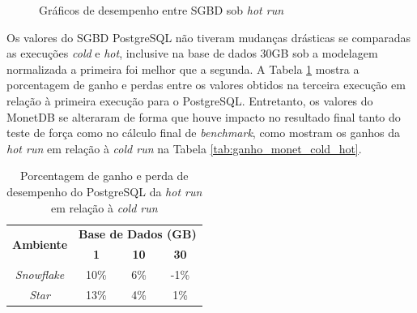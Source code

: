 \begin{figure}[htpb]
        \centering
        \caption{Gráficos de desempenho entre SGBD sob \textit{hot run}}
        \label{fig:qph_sgbd_hot}
\end{figure}

Os valores do SGBD PostgreSQL não tiveram mudanças drásticas se comparadas as execuções \textit{cold} e \textit{hot}, inclusive na base de dados 30GB sob a modelagem normalizada a primeira foi melhor que a segunda. A Tabela \ref{tab:ganho_postgresql_cold_hot} mostra a porcentagem de ganho e perdas entre os valores obtidos na terceira execução em relação à primeira execução para o PostgreSQL. Entretanto, os valores do MonetDB se alteraram de forma que houve impacto no resultado final tanto do teste de força como no cálculo final de \textit{benchmark}, como mostram os ganhos da \textit{hot run} em relação à \textit{cold run} na Tabela \ref{tab:ganho_monet_cold_hot}.

\begin{table}[htpb]
        \centering
        \caption{Porcentagem de ganho e perda de desempenho do PostgreSQL da \textit{hot run} em relação à \textit{cold run}}
        \label{tab:ganho_postgresql_cold_hot}
        \begin{tabular}{|c|c|c|c|}
        \hline
        \multirow{2}{*}{\textbf{Ambiente}} & \multicolumn{3}{c|}{\textbf{Base de Dados (GB)}} \\ \cline{2-4} 
        & \textbf{1}     & \textbf{10}    & \textbf{30}    \\ \hline
        \textit{Snowflake}                 & 10\%           & 6\%            & -1\%           \\ \hline
        \textit{Star}                      & 13\%           & 4\%            & 1\%            \\ \hline
        \end{tabular}
\end{table}

